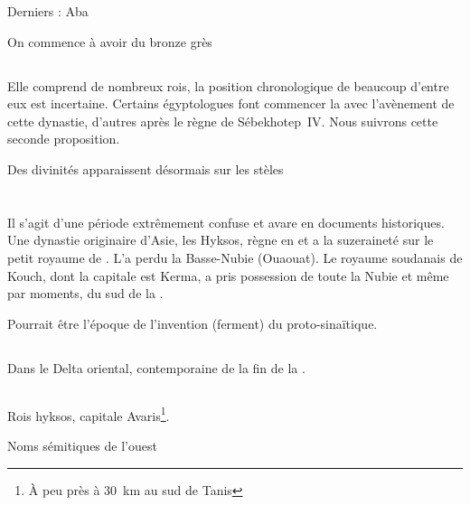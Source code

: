 Derniers \TP : Aba

On commence à avoir du bronze \donc{} grès

\subsection{\texorpdfstring{}{XIIIe dynastie}}

Elle comprend de nombreux rois, la position chronologique de beaucoup 
d'entre eux est incertaine. Certains égyptologues font commencer la 
\DPI avec l'avènement de cette dynastie, d'autres après le règne de 
Sébekhotep~IV. Nous suivrons cette seconde proposition.

Des divinités apparaissent désormais sur les stèles

\section{\DPI}

Il s'agit d'une période extrêmement confuse et avare en documents 
historiques. Une dynastie originaire d'Asie, les Hyksos, règne en 
\BE et a la suzeraineté sur le petit royaume de \HE. L'\kmt a perdu la
Basse-Nubie (Ouaouat). Le royaume soudanais de Kouch, dont la capitale 
est Kerma, a pris possession de toute la Nubie et même par moments, 
du sud de la \HE.

Pourrait être l'époque de l'invention (ferment) du proto-sinaïtique.


\subsection{\texorpdfstring{}{XIVe dynastie}}

Dans le Delta oriental, contemporaine de la fin de la .

\subsection{\texorpdfstring{}{XVe dynastie}}

Rois hyksos, capitale Avaris\footnote{À peu près à \SI{30}{\km} au sud 
de Tanis}.

Noms sémitiques de l'ouest

